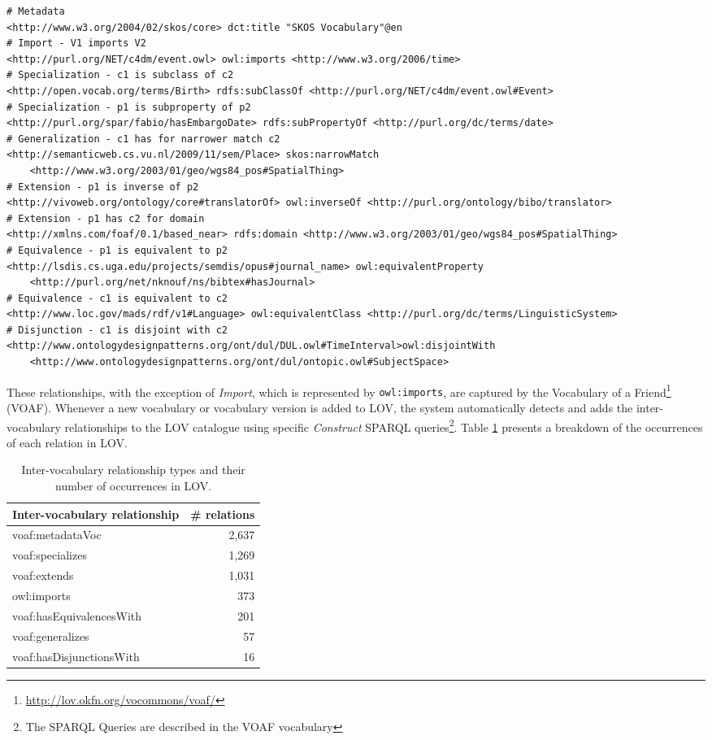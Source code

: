 \documentclass{iosart2c}
\begin{document}
\begin{lstlisting}[float=*,basicstyle=\tiny,label={list:voaf}, language=turtle, caption={Examples of Inter-vocabulary relationships.}]
# Metadata
<http://www.w3.org/2004/02/skos/core> dct:title "SKOS Vocabulary"@en
# Import - V1 imports V2
<http://purl.org/NET/c4dm/event.owl> owl:imports <http://www.w3.org/2006/time>
# Specialization - c1 is subclass of c2
<http://open.vocab.org/terms/Birth> rdfs:subClassOf <http://purl.org/NET/c4dm/event.owl#Event>
# Specialization - p1 is subproperty of p2  
<http://purl.org/spar/fabio/hasEmbargoDate> rdfs:subPropertyOf <http://purl.org/dc/terms/date>
# Generalization - c1 has for narrower match c2 
<http://semanticweb.cs.vu.nl/2009/11/sem/Place> skos:narrowMatch 
    <http://www.w3.org/2003/01/geo/wgs84_pos#SpatialThing>
# Extension - p1 is inverse of p2
<http://vivoweb.org/ontology/core#translatorOf> owl:inverseOf <http://purl.org/ontology/bibo/translator>
# Extension - p1 has c2 for domain 
<http://xmlns.com/foaf/0.1/based_near> rdfs:domain <http://www.w3.org/2003/01/geo/wgs84_pos#SpatialThing>
# Equivalence - p1 is equivalent to p2
<http://lsdis.cs.uga.edu/projects/semdis/opus#journal_name> owl:equivalentProperty 
    <http://purl.org/net/nknouf/ns/bibtex#hasJournal>
# Equivalence - c1 is equivalent to c2 
<http://www.loc.gov/mads/rdf/v1#Language> owl:equivalentClass <http://purl.org/dc/terms/LinguisticSystem>
# Disjunction - c1 is disjoint with c2
<http://www.ontologydesignpatterns.org/ont/dul/DUL.owl#TimeInterval>owl:disjointWith 
    <http://www.ontologydesignpatterns.org/ont/dul/ontopic.owl#SubjectSpace>
\end{lstlisting}

These relationships, with the exception of \emph{Import}, which is represented by {\small\texttt{owl:imports}}, are captured by the Vocabulary of a Friend\footnote{\url{http://lov.okfn.org/vocommons/voaf/}} (VOAF). Whenever a new vocabulary or vocabulary version is added to LOV, the system automatically detects and adds the inter-vocabulary relationships to the LOV catalogue using specific \emph{Construct} SPARQL queries\footnote{The SPARQL Queries are described in the VOAF vocabulary}. Table \ref{tab:voaf} presents a breakdown of the occurrences of each relation in LOV.

\begin{table}[h!tb]
\caption{Inter-vocabulary relationship types and their number of occurrences in LOV.}
\begin{tabular}{lr}
\hline
\textbf{Inter-vocabulary relationship} & \textbf{\# relations} \\ \hline
voaf:metadataVoc & 2,637 \\
voaf:specializes & 1,269 \\
voaf:extends & 1,031 \\
owl:imports & 373 \\
voaf:hasEquivalencesWith & 201 \\
voaf:generalizes & 57 \\
voaf:hasDisjunctionsWith & 16 \\
\hline  
\end{tabular}
\label{tab:voaf}
\end{table}
\end{document}
